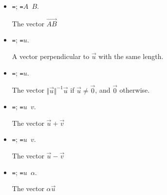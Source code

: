\begin{itemize}

\item \texttt{=};
\texttt{=$A$ $B$}.

The vector $\overrightarrow {AB}$

\item \texttt{=};
\texttt{=$u$}.

A vector perpendicular to $\vec u$ with the same length.

\item \texttt{=};
\texttt{=$u$}.

The vector $\Vert \vec u \Vert ^{-1} \vec u$
if $\vec u \neq \vec 0$, and $\vec 0$ otherwise.

\item \texttt{=};
\texttt{=$u$ $v$}.

The vector $\vec u + \vec v$

\item \texttt{=};
\texttt{=$u$ $v$}.

The vector $\vec u - \vec v$

\item \texttt{=};
\texttt{=$u$ $\alpha $}.

The vector $\alpha \vec u$

\end{itemize}

\endinput
